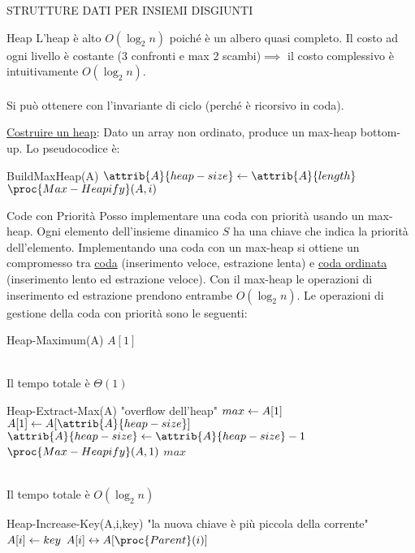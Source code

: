 \documentclass[8pt]{extarticle}
\begin{document}
\begin{formulario}
\begin{myParagraph}{STRUTTURE DATI PER INSIEMI DISGIUNTI}
\begin{subParagraph}{Heap}
L'heap è alto $O(\log_2 n)$ poiché è un albero quasi completo. Il costo ad ogni livello è costante (3 confronti e max 2 scambi)$\implies$ il costo complessivo è intuitivamente $O(\log_2 n)$. \\
\\ 
Si può ottenere con l'invariante di ciclo (perché è ricorsivo in coda).
				\begin{descr}{1}
					\item[\underline{Costruire un heap}:] Dato un array non ordinato, produce un max-heap bottom-up. Lo pseudocodice è: 
				\end{descr}
				\begin{code}{BuildMaxHeap(A)}
\li $\attrib{A}{heap-size}\get \attrib{A}{length}$
\li {}
	\li $\proc{Max-Heapify}(A,i)$
\END
				\end{code}
			\begin{subParagraph}{Code con Priorità}
Posso implementare una coda con priorità usando un max-heap. Ogni elemento dell'insieme dinamico $S$ ha una chiave che indica la priorità dell'elemento. Implementando una coda con un max-heap si ottiene un compromesso tra \underline{coda} (inserimento veloce, estrazione lenta) e \underline{coda ordinata} (inserimento lento ed estrazione veloce). Con il max-heap le operazioni di inserimento ed estrazione prendono entrambe $O(\log_2 n)$. Le operazioni di gestione della coda con priorità sono le seguenti:
				\begin{code}{Heap-Maximum(A)}
\li \RETURN $A[1]$
				\end{code}
\\
Il tempo totale è $\Theta(1)$\\
				\begin{code}{Heap-Extract-Max(A)}
\li {}
	\li \Error "overflow dell'heap"
\END
\li $max\leftarrow A[1]$
\li $A[1]\get A[\attrib{A}{heap-size}]$
\li $\attrib{A}{heap-size}\get \attrib{A}{heap-size}-1$
\li $\proc{Max-Heapify}(A,1)$
\li \RETURN $max$
				\end{code}
			\end{subParagraph}
\\
Il tempo totale è $O(\log_2 n)$\\
				\begin{code}{Heap-Increase-Key(A,i,key)}
\li {}
	\li \Error "la nuova chiave è più piccola della corrente"
\END
\li $A[i]\leftarrow key$
\li {}
	\li {} $A[i] \sse A[\proc{Parent}(i)]$

\end{code}
\end{subParagraph}
\end{myParagraph}
\end{formulario}
\end{document}
